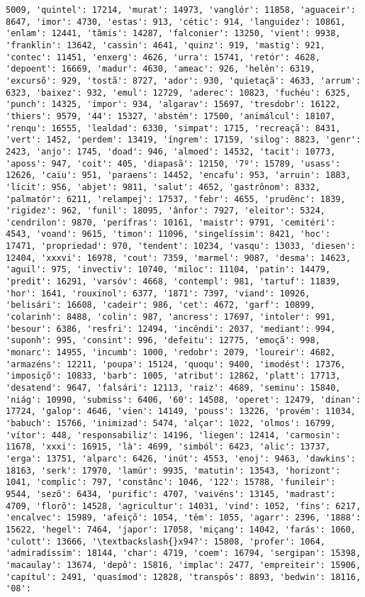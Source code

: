 \documentclass[11pt]{article}
\begin{document}
\begin{Verbatim}[commandchars=\\\{\}]
5009, 'quintel': 17214, 'murat': 14973, 'vanglór': 11858, 'aguaceir': 8647, 'imor': 4730, 'estas': 913, 'cétic': 914, 'languidez': 10861, 'enlam': 12441, 'tâmis': 14287, 'falconier': 13250, 'vient': 9938, 'franklin': 13642, 'cassin': 4641, 'quinz': 919, 'mastig': 921, 'contec': 11451, 'enxerg': 4626, 'urra': 15741, 'retór': 4628, 'depoent': 16669, 'madur': 4630, 'ameac': 926, 'helên': 6319, 'excursõ': 929, 'tostã': 8727, 'ador': 930, 'quietaçã': 4633, 'arrum': 6323, 'baixez': 932, 'emul': 12729, 'aderec': 10823, 'fuchéu': 6325, 'punch': 14325, 'impor': 934, 'algarav': 15697, 'tresdobr': 16122, 'thiers': 9579, '44': 15327, 'abstém': 17500, 'animálcul': 18107, 'renqu': 16555, 'lealdad': 6330, 'simpat': 1715, 'recreaçã': 8431, 'vert': 1452, 'perdem': 13419, 'íngrem': 17159, 'silog': 8823, 'genr': 2423, 'anjo': 1745, 'doad': 946, 'almoed': 14532, 'tacit': 10773, 'aposs': 947, 'coit': 405, 'diapasã': 12150, '7º': 15789, 'usass': 12626, 'caiu': 951, 'paraens': 14452, 'encafu': 953, 'arruin': 1883, 'lícit': 956, 'abjet': 9811, 'salut': 4652, 'gastrônom': 8332, 'palmatór': 6211, 'relampej': 17537, 'febr': 4655, 'prudênc': 1839, 'rigidez': 962, 'funil': 18095, 'ânfor': 7927, 'eleitor': 5324, 'cendrilon': 9870, 'perífras': 10161, 'maistr': 9791, 'cemitéri': 4543, 'voand': 9615, 'timon': 11096, 'singelíssim': 8421, 'hoc': 17471, 'propriedad': 970, 'tendent': 10234, 'vasqu': 13033, 'diesen': 12404, 'xxxvi': 16978, 'cout': 7359, 'marmel': 9087, 'desma': 14623, 'aguil': 975, 'invectiv': 10740, 'miloc': 11104, 'patin': 14479, 'predit': 16291, 'varsóv': 4668, 'contempl': 981, 'tartuf': 11839, 'hor': 1641, 'rouxinol': 6377, '1871': 7397, 'viand': 10926, 'belisári': 16608, 'cadeir': 986, 'cet': 4672, 'garf': 10899, 'colarinh': 8488, 'colin': 987, 'ancress': 17697, 'intoler': 991, 'besour': 6386, 'resfri': 12494, 'incêndi': 2037, 'mediant': 994, 'suponh': 995, 'consint': 996, 'defeitu': 12775, 'emoçã': 998, 'monarc': 14955, 'incumb': 1000, 'redobr': 2079, 'loureir': 4682, 'armazéns': 12211, 'poupa': 15124, 'quoqu': 9400, 'imodést': 17376, 'imposiçõ': 10833, 'barb': 1005, 'atribut': 12862, 'platt': 17713, 'desatend': 9647, 'falsári': 12113, 'raiz': 4689, 'seminu': 15840, 'niág': 10990, 'submiss': 6406, '60': 14508, 'operet': 12479, 'dinan': 17724, 'galop': 4646, 'vien': 14149, 'pouss': 13226, 'provém': 11034, 'babuch': 15766, 'inimizad': 5474, 'alçar': 1022, 'olmos': 16799, 'vítor': 448, 'responsabiliz': 14196, 'liegen': 12414, 'carmosin': 11678, 'xxxi': 16915, 'là': 4699, 'simból': 6423, 'alic': 13737, 'erga': 13751, 'alparc': 6426, 'inút': 4553, 'enoj': 9463, 'dawkins': 18163, 'serk': 17970, 'lamúr': 9935, 'matutin': 13543, 'horizont': 1041, 'complic': 797, 'constânc': 1046, '122': 15788, 'funileir': 9544, 'sezõ': 6434, 'purific': 4707, 'vaivéns': 13145, 'madrast': 4709, 'florõ': 14528, 'agricultur': 14031, 'vind': 1052, 'fins': 6217, 'encalvec': 15989, 'afeiçõ': 1054, 'têm': 1055, 'agarr': 2396, '1888': 15622, 'hegel': 7464, 'japor': 17058, 'miçang': 14042, 'farás': 1060, 'culott': 13666, '\textbackslash{}x94?': 15808, 'profer': 1064, 'admiradíssim': 18144, 'char': 4719, 'coem': 16794, 'sergipan': 15398, 'macaulay': 13674, 'depô': 15816, 'implac': 2477, 'empreiteir': 15906, 'capítul': 2491, 'quasímod': 12828, 'transpôs': 8893, 'bedwin': 18116, '08': 
\end{Verbatim}
\end{document}
